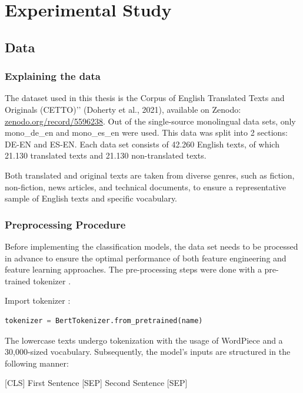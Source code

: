 
\chapter{Experimental Study}

\section{Data}

\subsection{Explaining the data}

The dataset used in this thesis is the \quotedblbase{}Corpus of English Translated Texts and Originals (CETTO)’’ (Doherty et al., 2021), available on Zenodo: \href{https://zenodo.org/record/5596238}{zenodo.org/record/5596238}. 
Out of the single-source monolingual data sets, only mono\_de\_en and mono\_es\_en were used.
This data was split into 2 sections: DE-EN and ES-EN.
Each data set consists of 42.260 English texts, of which 21.130 translated texts and 21.130 non-translated texts.

Both translated and original texts are taken from diverse genres, such as fiction, non-fiction, news articles, and technical documents, to ensure a representative sample of English texts and specific vocabulary. 

\subsection{Preprocessing Procedure}

Before implementing the classification models, the data set needs to be processed in advance to ensure the optimal performance of both feature engineering and feature learning approaches. The pre-processing steps were done with a pre-trained tokenizer \cite{huggingfaces}. 

Import tokenizer :
\begin{lstlisting}[language=Python]
    tokenizer = BertTokenizer.from_pretrained(name)
\end{lstlisting}

The lowercase texts undergo tokenization with the usage of WordPiece and a 30,000-sized vocabulary. Subsequently, the model's inputs are structured in the following manner:

\begin{center}
    [CLS] First Sentence [SEP] Second Sentence [SEP]
\end{center}

